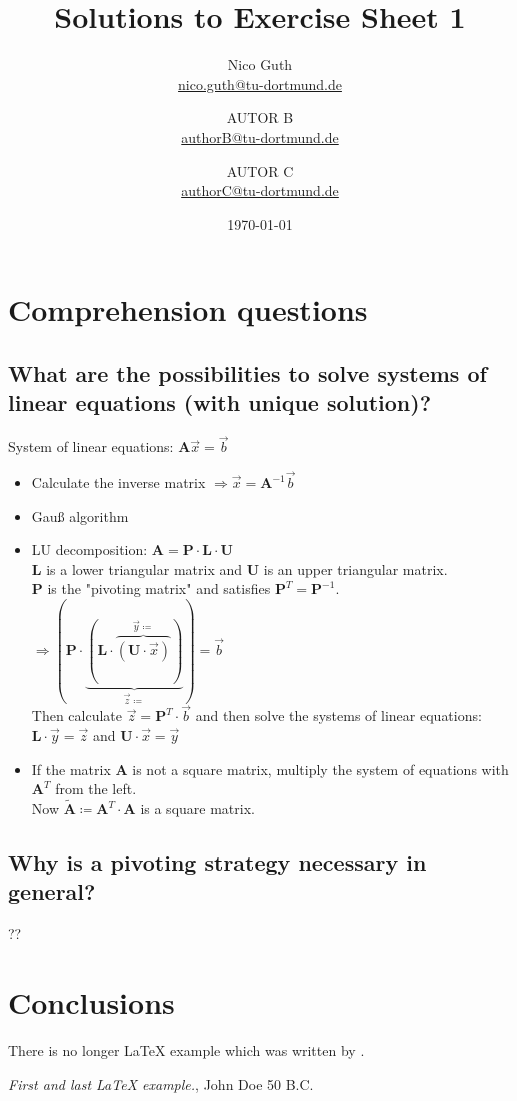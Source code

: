 \documentclass{scrartcl}
\title{Solutions to Exercise Sheet 1}
\author{
    Nico Guth  \\
    \href{mailto:nico.guth@tu-dortmund.de}{nico.guth@tu-dortmund.de}
	\and
	AUTOR B\\
    \href{mailto:authorB@tu-dortmund.de}{authorB@tu-dortmund.de}
	\and
	AUTOR C\\
    \href{mailto:authorC@tu-dortmund.de}{authorC@tu-dortmund.de}
	}
\date{\today}
\begin{document}
\maketitle

\setcounter{section}{-1}
\section{Comprehension questions}

\subsection{What are the possibilities to solve systems of linear equations (with unique solution)?}

System of linear equations: $\symbf{A} \overrightarrow{x}=\overrightarrow{b}$

\begin{itemize}
    \item Calculate the inverse matrix $\Rightarrow \overrightarrow{x} = \symbf{A}^{-1} \overrightarrow{b}$
    \item Gauß algorithm
    \item LU decomposition: $\symbf{A} = \symbf{P} \cdot \symbf{L} \cdot \symbf{U}$ \\
        $\symbf{L}$ is a lower triangular matrix and $\symbf{U}$ is an upper triangular matrix. \\
        $\symbf{P}$ is the "pivoting matrix" and satisfies $\symbf{P}^T=\symbf{P}^{-1}$. \\
        $\Rightarrow ( \symbf{P} \cdot \underbrace{ ( \symbf{L} \cdot \overbrace{ ( \symbf{U} \cdot \overrightarrow{x} ) }^{\overrightarrow{y}\coloneqq} ) }_{\overrightarrow{z} \coloneqq} ) = \overrightarrow{b}$ \\
        Then calculate $\overrightarrow{z} = \symbf{P}^T \cdot \overrightarrow{b}$ 
        and then solve the systems of linear equations:  \\
        $\symbf{L}\cdot\overrightarrow{y}=\overrightarrow{z}$ and $\symbf{U}\cdot\overrightarrow{x} = \overrightarrow{y}$
    \item If the matrix $\symbf{A}$ is not a square matrix, multiply the system of equations with $\symbf{A}^T$ from the left. \\
        Now $\tilde{\symbf{A}} \coloneqq \symbf{A}^T \cdot \symbf{A}$ is a square matrix.
  \end{itemize}

\subsection{Why is a pivoting strategy necessary in general?}

??


\section{Conclusions}\label{conclusions}
There is no longer \LaTeX{} example which was written by \cite{doe}.


\begin{thebibliography}{9}
 \emph{First and last \LaTeX{} example.},
John Doe 50 B.C. 
\end{thebibliography}
\end{document}
